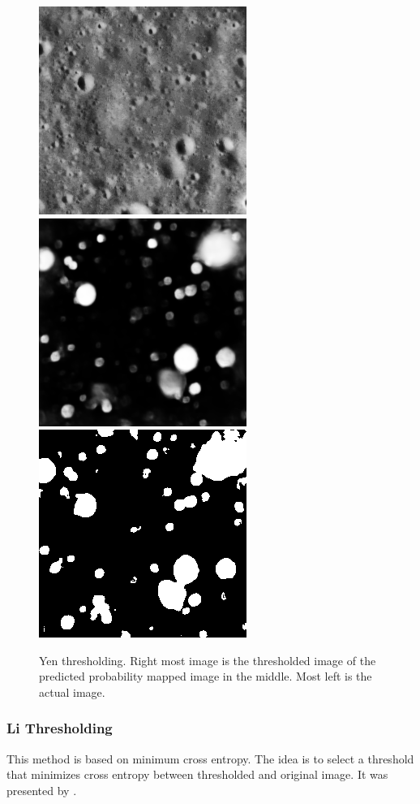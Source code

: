 \documentclass[11pt]{article}
\begin{document}
\begin{figure}[ht!]
	\includegraphics[width=.3\textwidth]{files/results/26.png}\hfill	
	\includegraphics[width=.3\textwidth]{files/results/26_predict.png}\hfill
	\includegraphics[width=.3\textwidth]{files/results/yen.png}\hfill
	\caption{Yen thresholding. Right most image is the thresholded image of the predicted probability mapped image in the middle. Most left is the actual image.}
	\label{Yen thresholding}
\end{figure}

\subsubsection{Li Thresholding}
This method is based on minimum cross entropy. The idea is to select a threshold that minimizes cross entropy between thresholded and original image. It was presented by \cite{li1993minimum}.
\end{document}
